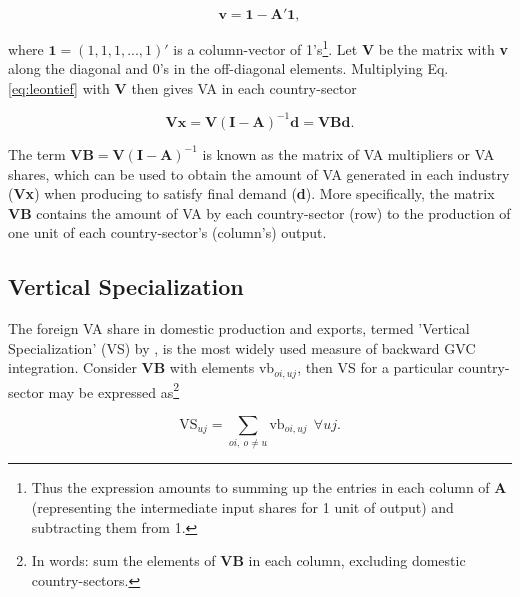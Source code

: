 \documentclass[a4paper]{article}
\begin{document}
\begin{equation}
\textbf{v} = \textbf{1} - \textbf{A}'\textbf{1},
\end{equation}

where $\textbf{1} = (1, 1, 1, ..., 1)'$ is a column-vector of 1's\footnote{Thus the expression amounts to summing up the entries in each column of \textbf{A} (representing the intermediate input shares for 1 unit of output) and subtracting them from 1.}. Let \textbf{V} be the matrix with \textbf{v} along the diagonal and 0's in the off-diagonal elements. Multiplying Eq. \ref{eq:leontief} with $\textbf{V}$ then gives VA in each country-sector

\begin{equation} \label{eq:VB}
\textbf{V}\textbf{x} = \textbf{V}(\textbf{I}-\textbf{A})^{-1} \textbf{d} = \textbf{VBd}.
\end{equation}

The term $\textbf{VB} = \textbf{V}(\textbf{I}-\textbf{A})^{-1}$ is known as the matrix of VA multipliers or VA shares, which can be used to obtain the amount of VA generated in each industry (\textbf{Vx}) when producing to satisfy final demand (\textbf{d}). More specifically, the matrix $\textbf{VB}$ contains the amount of VA by each country-sector (row) to the production of one unit of each country-sector's (column's) output. 


\subsection{Vertical Specialization}

The foreign VA share in domestic production and exports, termed 'Vertical Specialization' (VS) by \citet{hummels2001nature}, is the most widely used measure of backward GVC integration. Consider \textbf{VB} with elements vb$_{oi,uj}$, then VS for a particular country-sector may be expressed as\footnote{In words: sum the elements of \textbf{VB} in each column, excluding domestic country-sectors.}

\begin{equation} \label{eq:VS}
\text{VS}_{uj} = \sum_{oi,\ o \neq  u} \text{vb}_{oi, uj}\ \ \forall uj.
\end{equation}
\end{document}
